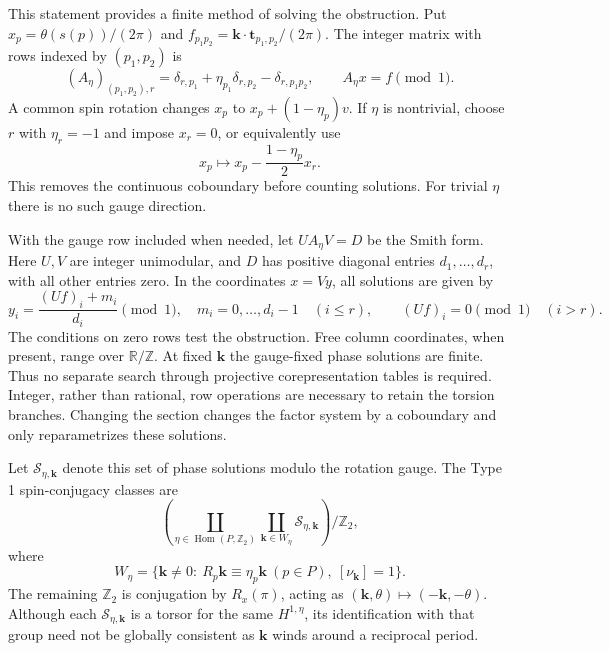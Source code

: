 This statement provides a finite method of solving the obstruction.
Put $x_p=\theta(s(p))/(2\pi)$ and
$f_{p_1p_2}=\bm k\cdot\bm t_{p_1,p_2}/(2\pi)$.
The integer matrix with rows indexed by $(p_1,p_2)$ is
\begin{equation}
 (A_\eta)_{(p_1,p_2),r}
 =\delta_{r,p_1}+\eta_{p_1}\delta_{r,p_2}-\delta_{r,p_1p_2},
 \qquad A_\eta x=f\pmod1.
 \tag{20a}\label{algmerge:phaselinear}
\end{equation}
A common spin rotation changes
$x_p$ to $x_p+(1-\eta_p)v$. If $\eta$ is nontrivial, choose
$r$ with $\eta_r=-1$ and impose $x_r=0$, or equivalently use
\begin{equation}
 x_p\longmapsto x_p-\frac{1-\eta_p}{2}x_r.
 \tag{20b}\label{algmerge:gauge}
\end{equation}
This removes the continuous coboundary before counting solutions.
For trivial $\eta$ there is no such gauge direction.

With the gauge row included when needed, let $U A_\eta V=D$ be
the Smith form. Here $U,V$ are integer unimodular, and $D$ has
positive diagonal entries $d_1,\ldots,d_r$, with all other
entries zero. In the coordinates $x=Vy$,
all solutions are given by
\begin{equation}
 y_i=\frac{(Uf)_i+m_i}{d_i}\pmod1,\quad
 m_i=0,\ldots,d_i-1\quad(i\le r),
 \qquad (Uf)_i=0\pmod1\quad(i>r).
 \tag{20c}\label{algmerge:smithfixed}
\end{equation}
The conditions on zero rows test the obstruction. Free column
coordinates, when present, range over $\mathbb R/\mathbb Z$.
At fixed $\bm k$ the gauge-fixed phase solutions are finite. Thus
no separate search through projective corepresentation tables is
required. Integer, rather than rational, row operations are necessary
to retain the torsion branches. Changing the section changes the
factor system by a coboundary and only reparametrizes these solutions.

Let $\mathcal S_{\eta,\bm k}$ denote this set of phase solutions
modulo the rotation gauge. The Type 1 spin-conjugacy classes are
\begin{equation}
 \left(\coprod_{\eta\in\operatorname{Hom}(P,\mathbb Z_2)}
 \coprod_{\bm k\in W_\eta}\mathcal S_{\eta,\bm k}\right)/\mathbb Z_2,
 \tag{21}\label{algmerge:axialclasses}
\end{equation}
where
\begin{equation}
 W_\eta=\{\bm k\ne0:\ R_p\bm k\equiv\eta_p\bm k\ (p\in P),
 \ [\nu_{\bm k}]=1\}.
 \tag{22}\label{algmerge:allowedwavevectors}
\end{equation}
The remaining $\mathbb Z_2$ is conjugation by $R_x(\pi)$, acting
as $(\bm k,\theta)\mapsto(-\bm k,-\theta)$. Although each
$\mathcal S_{\eta,\bm k}$ is a torsor for the same $H^{1,\eta}$,
its identification with that group need not be globally consistent
as $\bm k$ winds around a reciprocal period.

